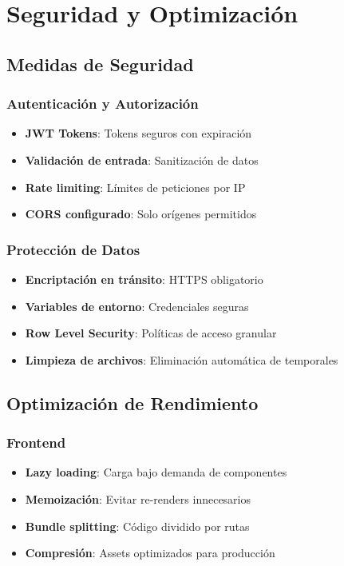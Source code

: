 \documentclass[12pt,a4paper]{report}
\begin{document}
\chapter{Seguridad y Optimización}

\section{Medidas de Seguridad}

\subsection{Autenticación y Autorización}
\begin{itemize}
    \item \textbf{JWT Tokens}: Tokens seguros con expiración
    \item \textbf{Validación de entrada}: Sanitización de datos
    \item \textbf{Rate limiting}: Límites de peticiones por IP
    \item \textbf{CORS configurado}: Solo orígenes permitidos
\end{itemize}

\subsection{Protección de Datos}
\begin{itemize}
    \item \textbf{Encriptación en tránsito}: HTTPS obligatorio
    \item \textbf{Variables de entorno}: Credenciales seguras
    \item \textbf{Row Level Security}: Políticas de acceso granular
    \item \textbf{Limpieza de archivos}: Eliminación automática de temporales
\end{itemize}

\section{Optimización de Rendimiento}

\subsection{Frontend}
\begin{itemize}
    \item \textbf{Lazy loading}: Carga bajo demanda de componentes
    \item \textbf{Memoización}: Evitar re-renders innecesarios
    \item \textbf{Bundle splitting}: Código dividido por rutas
    \item \textbf{Compresión}: Assets optimizados para producción
\end{itemize}
\end{document}

